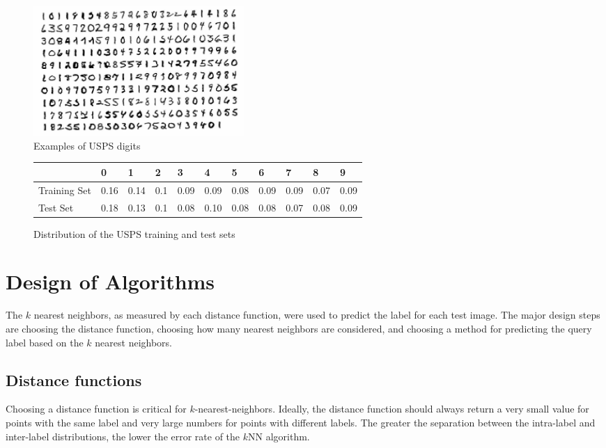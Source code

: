 \documentclass[10pt,twocolumn,letterpaper]{article}
\begin{document}
\begin{figure}[htbp]
  \centering

    \begin{minipage}{8 cm}
      \includegraphics[width=8cm]{digit2}
      \caption{Examples of USPS digits}
      \label{digits}
    \end{minipage}

\end{figure}
\begin{figure}[tb]
	\centering

 	\begin{tabular}{|l|l|l|l|l|l|l|l|l|l|l|}
  	\hline
  	 ~ & 0 & 1 & 2 & 3 & 4 & 5 & 6 & 7 & 8 & 9 \\ 
  	 \hline
		Training Set  & 0.16 & 0.14 & 0.1 & 0.09 & 0.09 & 0.08 & 0.09 & 0.09 & 0.07 & 0.09 \\ 
		Test Set & 0.18 & 0.13 & 0.1 & 0.08 & 0.10 & 0.08 & 0.08 & 0.07 & 0.08 & 0.09 \\
  	\hline
 		\end{tabular}
\caption{Distribution of the USPS training and test sets}
    \label{distribution}
\end{figure}

\section{Design of Algorithms}
The $k$ nearest neighbors, as measured by each distance function, were used to predict the label for each test image. The major design steps are choosing the distance function, choosing how many nearest neighbors are considered, and choosing a method for predicting the query label based on the $k$ nearest neighbors.

\subsection{Distance functions}
\label{distancefunctions} 


Choosing a distance function is critical for $k$-nearest-neighbors. Ideally, the distance function should always return a very small value for points with the same label and very large numbers for points with different labels. The greater the separation between the intra-label and inter-label distributions, the lower the error rate of the $k$NN algorithm. 
\end{document}
